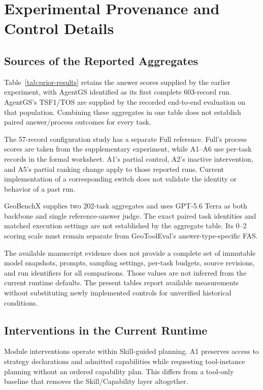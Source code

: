 \section{Experimental Provenance and Control Details}
\label{app:experimental-details}
\subsection{Sources of the Reported Aggregates}

Table~\ref{tab:prior-results} retains the answer scores supplied by the earlier experiment, with AgentGS identified as its first complete 603-record run. AgentGS's TSF1/TOS are supplied by the recorded end-to-end evaluation on that population. Combining these aggregates in one table does not establish paired answer/process outcomes for every task.

The 57-record configuration study has a separate Full reference. Full's process scores are taken from the supplementary experiment, while A1--A6 use per-task records in the formal worksheet. A1's partial control, A2's inactive intervention, and A5's partial ranking change apply to those reported runs. Current implementation of a corresponding switch does not validate the identity or behavior of a past run.

GeoBenchX supplies two 202-task aggregates and uses GPT-5.6 Terra as both backbone and single reference-answer judge. The exact paired task identities and matched execution settings are not established by the aggregate table. Its 0--2 scoring scale must remain separate from GeoToolEval's answer-type-specific FAS.

The available manuscript evidence does not provide a complete set of immutable model snapshots, prompts, sampling settings, per-task budgets, source revisions, and run identifiers for all comparisons. Those values are not inferred from the current runtime defaults. The present tables report available measurements without substituting newly implemented controls for unverified historical conditions.

\subsection{Interventions in the Current Runtime}
Module interventions operate within Skill-guided planning. A1 preserves access to strategy declarations and admitted capabilities while requesting tool-instance planning without an ordered capability plan. This differs from a tool-only baseline that removes the Skill/Capability layer altogether.

